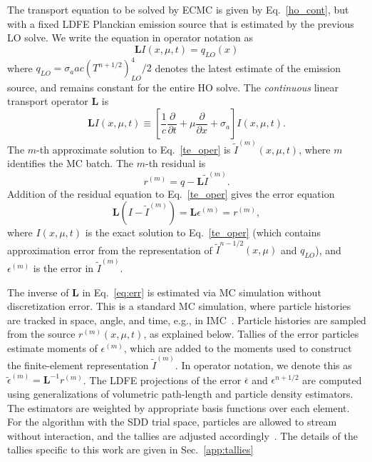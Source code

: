 \documentclass{anstrans}
\newcommand{\pderiv}[2]{\frac{\partial #1}{\partial #2}}
\newcommand{\B}[1]{\ensuremath{\mathbf{#1}}}
\begin{document}
The transport equation to be solved by ECMC is given by Eq.~\eqref{ho_cont}, but with a
fixed LDFE Planckian emission source that is estimated by the previous LO solve.  We write the equation in
operator notation as
\begin{equation}\label{te_oper}
    \B L I(x,\mu,t)  = q_{LO}(x)
\end{equation}
where $q_{LO} = \sigma_a a c \left(T^{n+1/2}\right)^{4}_{LO}/2$ denotes the latest estimate of the
emission source, and remains constant for the entire HO solve. 
The \emph{continuous} linear transport operator $\B L$ is
\begin{equation}\label{L_oper}
   \B L I(x,\mu,t) \equiv \left[ \frac{1}{c}\pderiv{}{t} + \mu \pderiv{}{x} + \sigma_a
    \right] I(x,\mu,t).
\end{equation}
The $m$-th approximate solution to Eq.~\eqref{te_oper} is $\tilde{I}^{(m)}(x,\mu,t)$, where
$m$ identifies the MC batch. The $m$-th residual is 
\begin{equation}\label{eq:res}
r^{(m)} = q - \B L\tilde{I}^{(m)}.
\end{equation}
 Addition
of the residual equation to Eq.~\eqref{te_oper} gives the error equation
\begin{equation}\label{eq:err}
\B L (I - \tilde{I}^{(m)}) = \B L {\epsilon}^{(m)} = r^{(m)},
\end{equation}
where $I(x,\mu,t)$ is the exact solution to Eq.~\eqref{te_oper} (which contains approximation error from the representation of
$\tilde I^{n-1/2}(x,\mu)$ and $q_{LO}$), and ${\epsilon}^{(m)}$ is the error in
$\tilde{I}^{(m)}$. 

The inverse of $\B L$ in Eq.~\eqref{eq:err} is estimated via MC simulation without discretization
error.  This is a standard MC simulation, where particle histories are tracked in space, angle, and
time, e.g., in IMC~\cite{fnc,wollaber_review,dissertation}.
Particle histories are sampled from the source $r^{(m)}(x,\mu,t)$, as explained below.
 Tallies of the error particles estimate 
moments of $\epsilon^{(m)}$, which are added to the moments used to construct the finite-element
representation 
$\tilde{I}^{(m)}$. In operator notation, we denote this as $\tilde{\epsilon}^{(m)} = \B L^{-1}
r^{(m)}$.    The LDFE projections of the
error $\overline{\epsilon}$ and $\epsilon^{n+1/2}$ are computed using generalizations of volumetric
path-length and particle density estimators. The estimators are weighted by appropriate basis
functions over each element.  For the algorithm with the SDD trial space, particles are allowed to stream without
interaction, and the tallies are adjusted accordingly~\cite{bolding_nse}.  
The details of the tallies specific to this work are given in Sec.~\ref{app:tallies}
\end{document}
